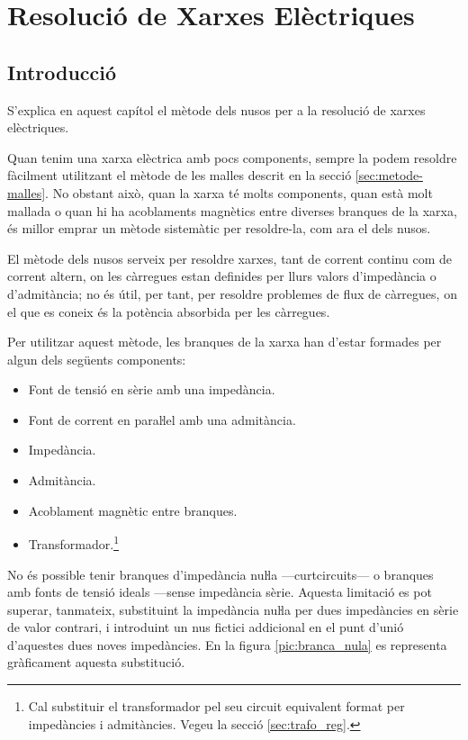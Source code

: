 
\chapter{Resolució de Xarxes Elèctriques} \label{sec:ch-xarxes-elec}
\section{Introducció}\label{sec:ch-xarxes-elec-intro}
S'explica en aquest capítol el
mètode dels nusos per a la resolució de xarxes elèctriques.

Quan tenim una xarxa elèctrica amb pocs components, sempre la podem resoldre fàcilment
utilitzant el mètode de les malles descrit en la secció \vref{sec:metode-malles}. No obstant això, quan la xarxa té molts components, quan està
 molt mallada o quan hi ha acoblaments magnètics entre diverses branques de la xarxa, és millor
 emprar un mètode sistemàtic per  resoldre-la, com ara el  dels nusos.

El mètode dels nusos serveix per resoldre xarxes, tant de corrent
continu com de corrent altern, on les càrregues estan definides per
llurs valors d'impedància o d'admitància; no és útil, per tant, per
resoldre problemes de flux de càrregues, on el que es coneix és la
potència absorbida per les càrregues.

Per utilitzar aquest mètode, les branques de la xarxa han d'estar
formades per algun dels següents components: \vspace{-1.5mm}
\begin{itemize}
   \item Font de tensió en sèrie amb una impedància.
   \item Font de corrent en paraŀlel amb una admitància.
   \item Impedància.
   \item Admitància.
   \item Acoblament magnètic entre branques.
   \item Transformador.\footnote{Cal substituir el transformador pel seu circuit equivalent format per impedàncies i    admitàncies. Vegeu la secció \ref{sec:trafo_reg}.}
\end{itemize}
\vspace{-1.5mm}

No és possible tenir branques d'impedància nuŀla ---curtcircuits--- o
branques amb fonts de tensió ideals  ---sense impedància sèrie.
Aquesta limitació es pot superar, tanmateix, substituint la
impedància nuŀla per dues impedàncies en sèrie  de valor
contrari, i introduint un nus fictici addicional en el punt d'unió
d'aquestes dues noves impedàncies. En la figura
\vref{pic:branca_nula}
 es representa gràficament aquesta substitució. 
\begin{center}
   
    \label{pic:branca_nula}
\end{center}

